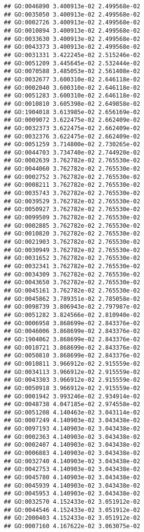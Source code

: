 \documentclass[
]{article}
\begin{document}
\begin{verbatim}
## GO:0046890 3.400913e-02 2.499568e-02
## GO:0035050 3.400913e-02 2.499568e-02
## GO:0002726 3.400913e-02 2.499568e-02
## GO:0010894 3.400913e-02 2.499568e-02
## GO:0033630 3.400913e-02 2.499568e-02
## GO:0043373 3.400913e-02 2.499568e-02
## GO:0031331 3.422245e-02 2.515246e-02
## GO:0051209 3.445645e-02 2.532444e-02
## GO:0070588 3.485053e-02 2.561408e-02
## GO:0032677 3.600310e-02 2.646118e-02
## GO:0002040 3.600310e-02 2.646118e-02
## GO:0051283 3.600310e-02 2.646118e-02
## GO:0010810 3.605398e-02 2.649858e-02
## GO:1904018 3.613985e-02 2.656169e-02
## GO:0009072 3.622475e-02 2.662409e-02
## GO:0032373 3.622475e-02 2.662409e-02
## GO:0032376 3.622475e-02 2.662409e-02
## GO:0051259 3.714800e-02 2.730265e-02
## GO:0044703 3.734740e-02 2.744920e-02
## GO:0002639 3.762782e-02 2.765530e-02
## GO:0044060 3.762782e-02 2.765530e-02
## GO:0002752 3.762782e-02 2.765530e-02
## GO:0008211 3.762782e-02 2.765530e-02
## GO:0035743 3.762782e-02 2.765530e-02
## GO:0039529 3.762782e-02 2.765530e-02
## GO:0050927 3.762782e-02 2.765530e-02
## GO:0099509 3.762782e-02 2.765530e-02
## GO:0002885 3.762782e-02 2.765530e-02
## GO:0010820 3.762782e-02 2.765530e-02
## GO:0021903 3.762782e-02 2.765530e-02
## GO:0030949 3.762782e-02 2.765530e-02
## GO:0031652 3.762782e-02 2.765530e-02
## GO:0032341 3.762782e-02 2.765530e-02
## GO:0034309 3.762782e-02 2.765530e-02
## GO:0043650 3.762782e-02 2.765530e-02
## GO:0045161 3.762782e-02 2.765530e-02
## GO:0045862 3.789351e-02 2.785058e-02
## GO:0098739 3.806943e-02 2.797987e-02
## GO:0051282 3.824566e-02 2.810940e-02
## GO:0006958 3.868699e-02 2.843376e-02
## GO:0046006 3.868699e-02 2.843376e-02
## GO:1904062 3.868699e-02 2.843376e-02
## GO:0010721 3.868699e-02 2.843376e-02
## GO:0050810 3.868699e-02 2.843376e-02
## GO:0010811 3.966912e-02 2.915559e-02
## GO:0034113 3.966912e-02 2.915559e-02
## GO:0043303 3.966912e-02 2.915559e-02
## GO:0050918 3.966912e-02 2.915559e-02
## GO:0001942 3.993246e-02 2.934914e-02
## GO:0048738 4.047185e-02 2.974558e-02
## GO:0051208 4.140463e-02 3.043114e-02
## GO:0007249 4.140903e-02 3.043438e-02
## GO:0097193 4.140903e-02 3.043438e-02
## GO:0002363 4.140903e-02 3.043438e-02
## GO:0002407 4.140903e-02 3.043438e-02
## GO:0006883 4.140903e-02 3.043438e-02
## GO:0032740 4.140903e-02 3.043438e-02
## GO:0042753 4.140903e-02 3.043438e-02
## GO:0045780 4.140903e-02 3.043438e-02
## GO:0045939 4.140903e-02 3.043438e-02
## GO:0045953 4.140903e-02 3.043438e-02
## GO:0032570 4.152433e-02 3.051912e-02
## GO:0044546 4.152433e-02 3.051912e-02
## GO:2000403 4.152433e-02 3.051912e-02
## GO:0007160 4.167622e-02 3.063075e-02

\end{verbatim}
\end{document}
